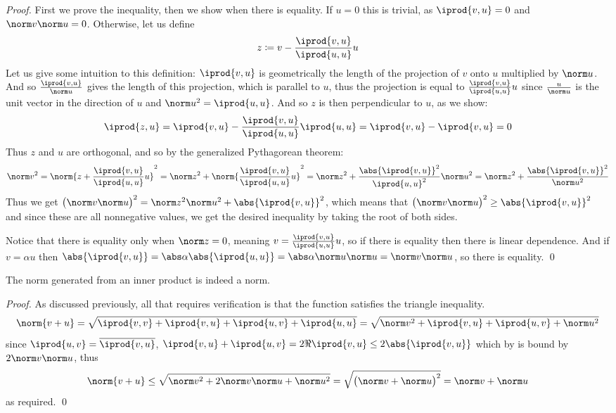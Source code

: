 \begin{proof}

    First we prove the inequality, then we show when there is equality.
    If $u=0$ this is trivial, as $\iprod{v,u}=0$ and $\norm v\norm u=0$.
    Otherwise, let us define
    \[ z\coloneqq v - \frac{\iprod{v,u}}{\iprod{u,u}}u \]
    Let us give some intuition to this definition: $\iprod{v,u}$ is geometrically the length of the projection of $v$ onto $u$ multiplied by $\norm u$.
    And so $\frac{\iprod{v,u}}{\norm u}$ gives the length of this projection, which is parallel to $u$, thus the projection is equal to $\frac{\iprod{v,u}}{\iprod{u,u}}u$ since $\frac u{\norm u}$ is the
    unit vector in the direction of $u$ and $\norm u^2=\iprod{u,u}$.
    And so $z$ is then perpendicular to $u$, as we show:
    \[ \iprod{z,u} = \iprod{v,u} - \frac{\iprod{v,u}}{\iprod{u,u}}\iprod{u,u} = \iprod{v,u} - \iprod{v,u} = 0 \]
    Thus $z$ and $u$ are orthogonal, and so by the generalized Pythagorean theorem:
    \[ \norm v^2 = \norm{z+\frac{\iprod{v,u}}{\iprod{u,u}}u}^2 = \norm z^2 + \norm{\frac{\iprod{v,u}}{\iprod{u,u}}u}^2 = \norm z^2 + \frac{\abs{\iprod{v,u}}^2}{\iprod{u,u}^2}\norm u^2 
    = \norm z^2 + \frac{\abs{\iprod{v,u}}^2}{\norm u^2} \]
    Thus we get $\bigl(\norm v\norm u\bigr)^2=\norm z^2\norm u^2+\abs{\iprod{v,u}}^2$, which means that $\bigl(\norm v\norm u\bigr)^2\geq\abs{\iprod{v,u}}^2$ and since these are all nonnegative values, we
    get the desired inequality by taking the root of both sides.

    Notice that there is equality only when $\norm z=0$, meaning $v=\frac{\iprod{v,u}}{\iprod{u,u}}u$, so if there is equality then there is linear dependence.
    And if $v=\alpha u$ then $\abs{\iprod{v,u}}=\abs\alpha\abs{\iprod{u,u}}=\abs\alpha\norm u\norm u=\norm v\norm u$, so there is equality.
    \qed

\end{proof}

\begin{thrm*}

    The norm generated from an inner product is indeed a norm.

\end{thrm*}

\begin{proof}

    As discussed previously, all that requires verification is that the function satisfies the triangle inequality.
    \[ \norm{v+u} = \sqrt{\iprod{v,v} + \iprod{v,u} + \iprod{u,v} + \iprod{u,u}} = \sqrt{\norm v^2 + \iprod{v,u} + \iprod{u,v} + \norm u^2} \]
    since $\iprod{u,v}=\overline{\iprod{v,u}}$, $\iprod{v,u}+\iprod{u,v}=2\Re\iprod{v,u}\leq2\abs{\iprod{v,u}}$ which by  is bound by $2\norm v\norm u$, thus
    \[ \norm{v+u} \leq \sqrt{\norm v^2 + 2\norm v\norm u + \norm u^2} = \sqrt{\bigl(\norm v+\norm u\bigr)^2} = \norm v + \norm u \]
    as required.
    \qed

\end{proof}


